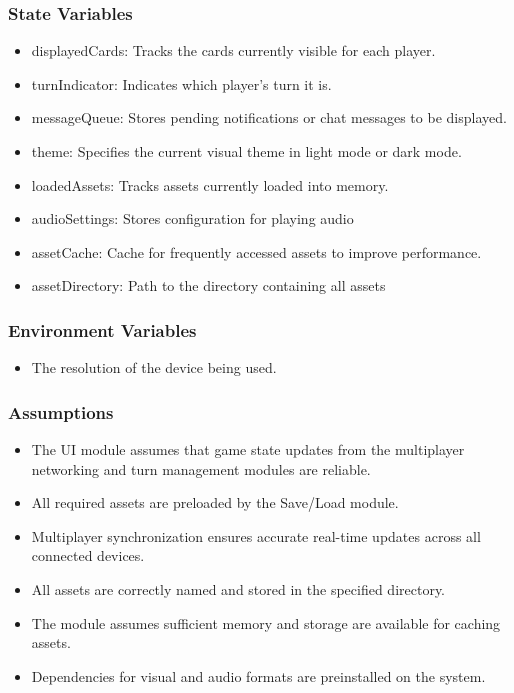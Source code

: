 \documentclass[12pt, titlepage]{article}
\begin{document}
\subsubsection{State Variables}
\begin{itemize}
\item displayedCards: Tracks the cards currently visible for each player.
\item turnIndicator: Indicates which player’s turn it is.
\item messageQueue: Stores pending notifications or chat messages to be displayed.
\item theme: Specifies the current visual theme in light mode or dark mode.
\item loadedAssets: Tracks assets currently loaded into memory.
\item audioSettings: Stores configuration for playing audio
\item assetCache: Cache for frequently accessed assets to improve performance.
\item assetDirectory: Path to the directory containing all assets 

\end{itemize}

\subsubsection{Environment Variables}
\begin{itemize}
\item The resolution of the device being used.
\end{itemize}

\subsubsection{Assumptions}
\begin{itemize}
\item The UI module assumes that game state updates from the multiplayer networking and turn management modules are reliable.
\item All required assets are preloaded by the Save/Load module.
\item Multiplayer synchronization ensures accurate real-time updates across all connected devices.
\item All assets are correctly named and stored in the specified directory.
\item The module assumes sufficient memory and storage are available for caching assets.
\item Dependencies for visual and audio formats are preinstalled on the system.
\end{itemize}
\end{document}

